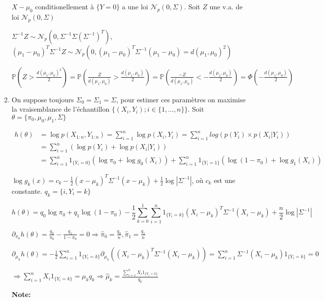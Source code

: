\documentclass[10pt,a4paper,oneside]{article}
\begin{document}
\begin{enumerate}
$X - \mu_0$ conditionellement à $\{ Y = 0 \}$ a une loi $\mathcal{N}_p(0, \Sigma)$. Soit $Z$ une v.a. de loi $\mathcal{N}_p(0, \Sigma)$

$\Sigma^{-1} Z \sim  \mathcal{N}_p(0,\Sigma^{-1} \Sigma (\Sigma^{-1})^T)$, $(\mu_1 - \mu_0)^T \Sigma^{-1} Z \sim  \mathcal{N}_p(0, (\mu_1 - \mu_0)^T \Sigma^{-1} (\mu_1 - \mu_0) = d(\mu_1, \mu_0)^2)$

$\mathbb{P}(Z > \frac{d(\mu_1,\mu_0)^2}{2}) = \mathbb{P}(\frac{Z}{d(\mu_1,\mu_0)} > \frac{d(\mu_1,\mu_0)}{2}) = \mathbb{P}(\frac{-Z}{d(\mu_1,\mu_0)} < -\frac{d(\mu_1,\mu_0)}{2}) = \Phi(-\frac{d(\mu_1,\mu_0)}{2})$

\item
On suppose toujours $\Sigma_0 = \Sigma_1= \Sigma$, pour estimer ces paramètres on maximise la vraisemblance de l'échantillon $\{ (X_i,Y_i); i \in \{ 1,\ldots,n \} \}$. Soit $\theta = \{  \pi_0, \mu_0, \mu_1, \Sigma \}$

\begin{align*}
h(\theta) &= \log p(X_{1:n},Y_{1:n}) = \sum_{i = 1}^n \log p(X_i,Y_i) = \sum_{i = 1}^n log(p(Y_i) \times p(X_i | Y_i)) \\
&= \sum_{i = 1}^n (\log p(Y_i) + \log p(X_i | Y_i)) \\
&= \sum_{i = 1}^n 1_{\{ Y_i = 0 \}}(\log \pi_0 + \log g_0(X_i)) + \sum_{i = 1}^n 1_{\{Y_i = 1 \}} (\log(1 - \pi_0) + \log g_1(X_i))
\end{align*}

$\log g_k(x) = c_k - \frac{1}{2}(x - \mu_k)^T \Sigma^{-1}(x - \mu_k) + \frac{1}{2} \log |\Sigma^{-1}|$, où $c_k$ est une constante.
$q_k =  \{ i,Y_i = k \}$

\[ h(\theta) = q_0 \log \pi_0 + q_1 \log(1-\pi_0) - \frac{1}{2} \sum_{k = 0}^1 \sum_{i = 1}^n 1_{\{Y_i = k\}} (X_i - \mu_k)^T \Sigma^{-1} (X_i - \mu_k) + \frac{n}{2} \log | \Sigma^{-1} | \]

$\partial_{\pi_0}h(\theta) = \frac{q_0}{\pi_0} - \frac{q_1}{1 - \pi_0} = 0 \Rightarrow \boxed{ \hat{\pi}_0 = \frac{q_0}{n}}, \boxed{\hat{\pi}_1 = \frac{q_1}{n}}$

$\partial_{\mu_k} h(\theta) = -\frac{1}{2} \sum_{i = 1}^n 1_{\{Y_i = k\}} \partial_{\mu_k} ( (X_i - \mu_k)^T \Sigma^{-1} (X_i - \mu_k) ) = \sum_{i = 1}^n \Sigma^{-1}(X_i - \mu_k) 1_{\{Y_i = k\}} = 0$

$\Rightarrow \sum_{i = 1}^n X_i 1_{\{ Y_i = k \}} = \mu_k q_k \Rightarrow \boxed{ \hat{\mu}_k = \frac{\sum_{i = 1}^n X_i 1_{\{Y_i = k\}}}{q_k} }$

\textbf{Note:}
\begin{itemize}


\end{itemize}
\end{enumerate}
\end{document}
